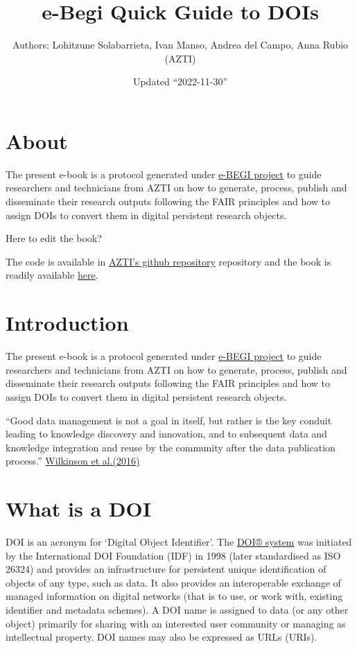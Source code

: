 \documentclass[
]{book}
\title{e-Begi Quick Guide to DOIs}
\author{Authors: Lohitzune Solabarrieta, Ivan Manso, Andrea del Campo, Anna Rubio (AZTI)}
\date{Updated ``2022-11-30''}
\begin{document}
\maketitle

{
\setcounter{tocdepth}{1}
\tableofcontents
}
\hypertarget{about}{%
\chapter*{About}\label{about}}

The present e-book is a protocol generated under \href{https://www.azti.es/proyectos/ebegi/}{e-BEGI project} to guide researchers and technicians from AZTI on how to generate, process, publish and disseminate their research outputs following the FAIR principles and how to assign DOIs to convert them in digital persistent research objects.

Here to edit the book?

The code is available in \href{https://github.com/Fundacion-AZTI/ebegi_quickguide2DOIs}{AZTI's github repository} repository and the book is readily available \href{https://fundacion-azti.github.io/ebegi_quickguide2DOIs/}{here}.

\hypertarget{introduction}{%
\chapter{Introduction}\label{introduction}}

The present e-book is a protocol generated under \href{https://www.azti.es/proyectos/ebegi/}{e-BEGI project} to guide researchers and technicians from AZTI on how to generate, process, publish and disseminate their research outputs following the FAIR principles and how to assign DOIs to convert them in digital persistent research objects.

``Good data management is not a goal in itself, but rather is the key conduit leading to knowledge discovery and innovation, and to subsequent data and knowledge integration and reuse by the community after the data publication process.'' \href{https://www.nature.com/articles/sdata201618}{Wilkinson et al.(2016)}

\hypertarget{what-is-a-doi}{%
\chapter{What is a DOI}\label{what-is-a-doi}}

DOI is an acronym for `Digital Object Identifier'. The \href{https://www.doi.org/}{DOI® system} was initiated by the International DOI Foundation (IDF) in 1998 (later standardised as ISO 26324) and provides an infrastructure for persistent unique identification of objects of any type, such as data. It also provides an interoperable exchange of managed information on digital networks (that is to use, or work with, existing identifier and metadata schemes). A DOI name is assigned to data (or any other object) primarily for sharing with an interested user community or managing as intellectual property. DOI names may also be expressed as URLs (URIs).
\end{document}
